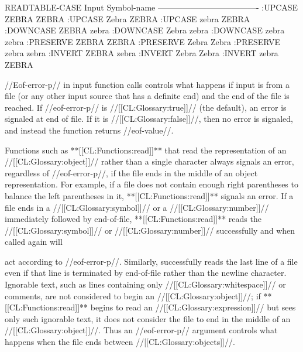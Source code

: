 \code
 READTABLE-CASE     Input Symbol-name
 -------------------------------------
    :UPCASE         ZEBRA   ZEBRA
    :UPCASE         Zebra   ZEBRA
    :UPCASE         zebra   ZEBRA
    :DOWNCASE       ZEBRA   zebra
    :DOWNCASE       Zebra   zebra
    :DOWNCASE       zebra   zebra
    :PRESERVE       ZEBRA   ZEBRA
    :PRESERVE       Zebra   Zebra
    :PRESERVE       zebra   zebra
    :INVERT         ZEBRA   zebra
    :INVERT         Zebra   Zebra
    :INVERT         zebra   ZEBRA \endcode

\endsubsubsection%

\endsubsection%



//Eof-error-p// in input function calls controls what happens if input is from a file (or any other input source that has a definite end) and the end of the file is reached. If //eof-error-p// is //[[CL:Glossary:true]]// (the default),  an error  is signaled at end of file.  If it is //[[CL:Glossary:false]]//, then no error is signaled, and instead the function returns //eof-value//.

Functions such as **[[CL:Functions:read]]** that read the representation of an //[[CL:Glossary:object]]// rather than a single character always signals an error, regardless of //eof-error-p//, if the file ends in the middle of an object representation. For example, if a file does not contain enough right parentheses to balance the left parentheses in it, **[[CL:Functions:read]]** signals an error.  If a file ends in a  //[[CL:Glossary:symbol]]// or a //[[CL:Glossary:number]]// immediately followed by end-of-file, **[[CL:Functions:read]]** reads the  //[[CL:Glossary:symbol]]// or //[[CL:Glossary:number]]//  successfully and when called again will

act according to //eof-error-p//. Similarly,  successfully reads the last line of a file even if that line is terminated by end-of-file rather than the newline character. Ignorable text, such as lines containing only //[[CL:Glossary:whitespace]]// or comments, are not considered to begin an //[[CL:Glossary:object]]//;  if **[[CL:Functions:read]]** begins to read an //[[CL:Glossary:expression]]// but sees only such ignorable text, it does not consider the file to end in the middle of an //[[CL:Glossary:object]]//. Thus an //eof-error-p// argument controls what happens when the file ends between //[[CL:Glossary:objects]]//.

